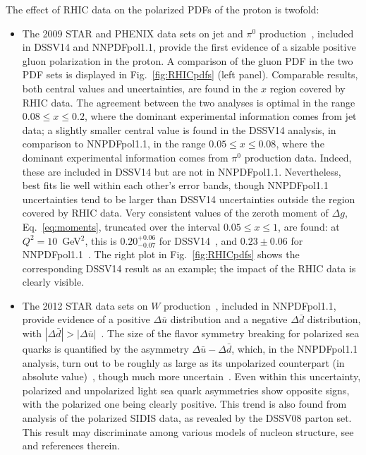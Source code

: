 The effect of RHIC data on the polarized PDFs of the proton is twofold:
\begin{itemize}

\item The 2009 STAR and PHENIX data sets on jet and $\pi^0$ 
production~\cite{Adamczyk:2014ozi,Adare:2014hsq}, included in DSSV14
and NNPDFpol1.1, provide the first evidence
of a sizable positive gluon polarization in the proton. 
%
A comparison of the gluon PDF in the two PDF sets is displayed in 
Fig.~\ref{fig:RHICpdfs} (left panel). 
%
Comparable results, both central values and uncertainties, are found in the 
$x$ region covered by RHIC data. 
%
The agreement between the two analyses is optimal in the
range $0.08\leq x \leq 0.2$, where the dominant experimental information comes
from jet data; a slightly smaller central value is found in the DSSV14 
analysis, in comparison to NNPDFpol1.1, in the range 
$0.05\leq x \leq 0.08$, where the dominant experimental information comes from 
$\pi^0$ production data. 
%
Indeed, these are included in DSSV14 but are not in NNPDFpol1.1. 
%
Nevertheless, best fits lie well within each other's error
bands, though NNPDFpol1.1 uncertainties tend to be larger than DSSV14
uncertainties outside the region covered by RHIC data.
%
Very consistent values of the zeroth moment of $\Delta g$, 
Eq.~\eqref{eq:moments}, truncated over the interval $0.05\leq x \leq 1$, are 
found: at $Q^2=10$~GeV$^2$, this is $0.20^{+0.06}_{-0.07}$ for 
DSSV14~\cite{deFlorian:2014yva}, and $0.23\pm 0.06$ for 
NNPDFpol1.1~\cite{Nocera:2014gqa}. The right plot in Fig.~\ref{fig:RHICpdfs} 
shows the corresponding DSSV14 result as an example; the impact of the RHIC
data is clearly visible. 

\item The 2012 STAR data sets on $W$ production~\cite{Adamczyk:2014xyw}, 
included in NNPDFpol1.1, provide evidence of a positive 
$\Delta\bar{u}$ distribution 
and a negative $\Delta\bar{d}$ distribution, with 
$|\Delta\bar{d}|>|\Delta\bar{u}|$~\cite{Nocera:2014gqa}.
% 
The size of the flavor symmetry breaking for polarized sea quarks is 
quantified by the asymmetry $\Delta\bar{u}-\Delta\bar{d}$, which,
in the NNPDFpol1.1 analysis, turn out to be roughly as large as its 
unpolarized counterpart (in absolute value)~\cite{Ball:2017nwa}, 
though much more uncertain~\cite{Nocera:2014rea}. 
%
Even within this uncertainty, polarized and unpolarized light sea quark 
asymmetries show opposite signs, with the polarized one being clearly positive. 
% 
This trend is also found from analysis of the polarized SIDIS data, 
as revealed by the DSSV08 parton set. 
%
This result may discriminate among various models of nucleon structure, 
see~\cite{Nocera:2014rea} and references therein. 

\end{itemize}

